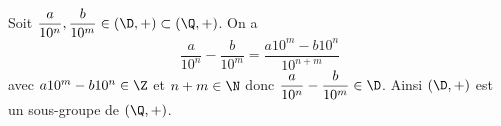 Soit $\dfrac{a}{10^n}, \dfrac{b}{10^m}\in(\D,+)\subset (\Q,+)$. On a
\[
  \dfrac{a}{10^n}-\dfrac{b}{10^m} = \dfrac{a10^m-b10^n}{10^{n+m}}
\]
avec $a10^m-b10^n\in\Z$ et $n+m\in\N$ donc
$\dfrac{a}{10^n}-\dfrac{b}{10^m}\in\D$.  Ainsi $(\D,+)$ est un sous-groupe de
$(\Q,+)$.

